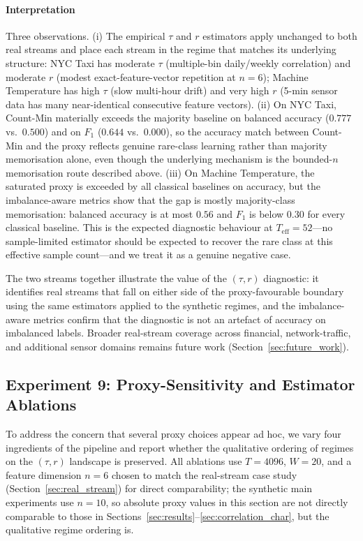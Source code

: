 \documentclass[preprint,12pt,authoryear]{elsarticle}
\newcommand{\Teff}{T_{\mathrm{eff}}}
\begin{document}
\paragraph{Interpretation} Three observations.
(i) The empirical $\tau$ and $r$ estimators apply unchanged to both real streams and place each stream in the regime that matches its underlying structure: NYC Taxi has moderate $\tau$ (multiple-bin daily/weekly correlation) and moderate $r$ (modest exact-feature-vector repetition at $n = 6$); Machine Temperature has high $\tau$ (slow multi-hour drift) and very high $r$ (5-min sensor data has many near-identical consecutive feature vectors).
(ii) On NYC Taxi, Count-Min materially exceeds the majority baseline on balanced accuracy ($0.777$ vs.\ $0.500$) and on $F_1$ ($0.644$ vs.\ $0.000$), so the accuracy match between Count-Min and the proxy reflects genuine rare-class learning rather than majority memorisation alone, even though the underlying mechanism is the bounded-$n$ memorisation route described above.
(iii) On Machine Temperature, the saturated proxy is exceeded by all classical baselines on accuracy, but the imbalance-aware metrics show that the gap is mostly majority-class memorisation: balanced accuracy is at most $0.56$ and $F_1$ is below $0.30$ for every classical baseline. This is the expected diagnostic behaviour at $\Teff = 52$---no sample-limited estimator should be expected to recover the rare class at this effective sample count---and we treat it as a genuine negative case.

The two streams together illustrate the value of the $(\tau, r)$ diagnostic: it identifies real streams that fall on either side of the proxy-favourable boundary using the same estimators applied to the synthetic regimes, and the imbalance-aware metrics confirm that the diagnostic is not an artefact of accuracy on imbalanced labels. Broader real-stream coverage across financial, network-traffic, and additional sensor domains remains future work (Section~\ref{sec:future_work}).


\subsection{Experiment 9: Proxy-Sensitivity and Estimator Ablations}
\label{sec:ablations}

To address the concern that several proxy choices appear ad hoc, we vary four ingredients of the pipeline and report whether the qualitative ordering of regimes on the $(\tau, r)$ landscape is preserved. All ablations use $T = 4096$, $W = 20$, and a feature dimension $n = 6$ chosen to match the real-stream case study (Section~\ref{sec:real_stream}) for direct comparability; the synthetic main experiments use $n = 10$, so absolute proxy values in this section are not directly comparable to those in Sections~\ref{sec:results}--\ref{sec:correlation_char}, but the qualitative regime ordering is.
\end{document}
